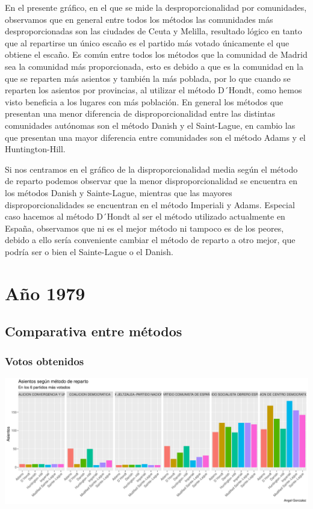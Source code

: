 \documentclass[12pt,a4paper,]{book}
\numberwithin{dummy}{section}
\theoremstyle{ocrenumbox}
\theoremstyle{blacknumex}
\theoremstyle{blacknumbox}
\theoremstyle{ocrenum}
\theoremstyle{ocrenum}
\begin{document}
En el presente gráfico, en el que se mide la desproporcionalidad por
comunidades, observamos que en general entre todos los métodos las
comunidades más desproporcionadas son las ciudades de Ceuta y Melilla,
resultado lógico en tanto que al repartirse un único escaño es el
partido más votado únicamente el que obtiene el escaño. Es común entre
todos los métodos que la comunidad de Madrid sea la comunidad más
proporcionada, esto es debido a que es la comunidad en la que se
reparten más asientos y también la más poblada, por lo que cuando se
reparten los asientos por provincias, al utilizar el método D´Hondt,
como hemos visto beneficia a los lugares con más población. En general
los métodos que presentan una menor diferencia de disproporcionalidad
entre las distintas comunidades autónomas son el método Danish y el
Saint-Lague, en cambio las que presentan una mayor diferencia entre
comunidades son el método Adams y el Huntington-Hill.

Si nos centramos en el gráfico de la disproporcionalidad media según el
método de reparto podemos observar que la menor disproporcionalidad se
encuentra en los métodos Danish y Sainte-Lague, mientras que las mayores
disproporcionalidades se encuentran en el método Imperiali y Adams.
Especial caso hacemos al método D´Hondt al ser el método utilizado
actualmente en España, observamos que ni es el mejor método ni tampoco
es de los peores, debido a ello sería conveniente cambiar el método de
reparto a otro mejor, que podría ser o bien el Sainte-Lague o el Danish.

\hypertarget{auxf1o-1979}{%
\section{Año 1979}\label{auxf1o-1979}}

\hypertarget{comparativa-entre-muxe9todos-1}{%
\subsection{Comparativa entre
métodos}\label{comparativa-entre-muxe9todos-1}}

\hypertarget{votos-obtenidos-1}{%
\subsubsection{Votos obtenidos}\label{votos-obtenidos-1}}

\begin{center}\includegraphics[width=0.95\linewidth]{figurasR/unnamed-chunk-68-1} \end{center}
\end{document}
